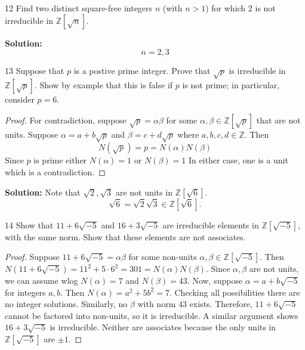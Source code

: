 \begin{problem}{12}
    Find two distinct square-free integers $n$ (with $n > 1$) for which $2$
        is not irreducible in $\mathbb{Z}[\sqrt{n}]$.
\end{problem}
\solved

\textbf{Solution: }
\[n = 2, 3\]

\begin{problem}{13}
    Suppose that $p$ is a postive prime integer.
    Prove that $\sqrt{p}$ is irreducible in $\mathbb{Z}[\sqrt{p}]$.
    Show by example that this is false if $p$ is not prime; in particular, consider $p = 6$.
\end{problem}
\solved

\begin{proof}
    For contradiction, suppose $\sqrt{p} = \alpha \beta$ for some $\alpha, \beta \in \mathbb{Z}[\sqrt{p}]$ that are not units.  
    Suppose $\alpha = a + b \sqrt{p}$ and $\beta = c + d \sqrt{p}$ where $a,b,c,d \in \mathbb{Z}$.  
    Then 
    \[
        N(\sqrt{p}) = p = N(\alpha)N(\beta)
    \]
    Since $p$ is prime either $N(\alpha) = 1$ or $N(\beta) = 1$
    In either case, one is a unit which is a contradiction.
\end{proof}

\textbf{Solution: }
Note that $\sqrt{2}, \sqrt{3}$ are not units in $\mathbb{Z}[\sqrt{6}]$.
\[\sqrt{6} = \sqrt{2}\sqrt{3} \in \mathbb{Z}[\sqrt{6}].\]

\begin{problem}{14}
    Show that $11 + 6 \sqrt{-5}$ and $16 + 3 \sqrt{-5}$ are irreducible elements in $\mathbb{Z}[\sqrt{-5}]$,
        with the same norm. Show that these elements are not associates.
\end{problem}
\solved

\begin{proof}
    Suppose $11 + 6 \sqrt{-5} = \alpha \beta$ for some non-units $\alpha, \beta \in \mathbb{Z}[\sqrt{-5}]$.
    Then $N(11 + 6 \sqrt{-5}) = 11^2 + 5 \cdot 6^2 = 301 = N(\alpha) N(\beta)$.
    Since $\alpha, \beta$ are not units, we can assume wlog $N(\alpha) = 7$ and $N(\beta) = 43$.
    Now, suppose $\alpha = a + b \sqrt{-5}$ for integers $a,b$. Then $N(\alpha) = a^2 + 5 b^2 = 7$.
    Checking all possibilities there are no integer solutions.
    Similarly, no $\beta$ with norm $43$ exists.
    Therefore, $11 + 6 \sqrt{-5}$ cannot be factored into non-units, so it is irreducible.
    A similar argument shows $16 + 3 \sqrt{-5}$ is irreducible.
    Neither are associates because the only units in $\mathbb{Z}[\sqrt{-5}]$ are $\pm 1$.
\end{proof}

